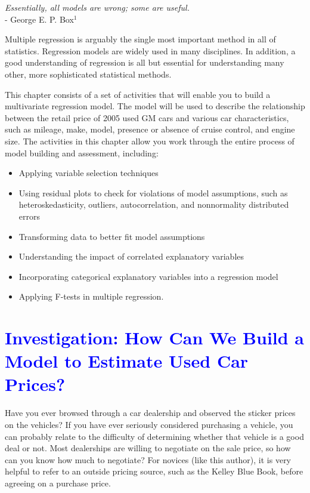 \documentclass[
]{report}
\begin{document}
\begin{flushright}
\emph{Essentially, all models are wrong; some are useful.} \\
- George E. P. Box$^1$
\end{flushright}

Multiple regression is arguably the single most important method in all of statistics.
Regression models are widely used in many disciplines. In addition, a good understanding
of regression is all but essential for understanding many other, more sophisticated
statistical methods.

This chapter consists of a set of activities that will enable you to build a multivariate
regression model. The model will be used to describe the relationship between the retail price of 2005 used GM cars and various car characteristics, such as mileage, make, model, presence or absence of cruise control, and engine size. The activities in this chapter allow you work through the entire process of model building and assessment, including:
\vspace{-1em}

\begin{itemize}
\item  Applying variable selection techniques
\item  Using residual plots to check for violations of model assumptions, such as heteroskedasticity, outliers, autocorrelation, and nonnormality distributed errors
\item  Transforming data to better fit model assumptions
\item  Understanding the impact of correlated explanatory variables
\item  Incorporating categorical explanatory variables into a regression model
\item  Applying F-tests in multiple regression.
\end{itemize}

\newpage

\hypertarget{section-26}{%
\section{\texorpdfstring{\textcolor{blue}{Investigation: How Can We Build a Model to Estimate Used Car Prices?}}{}}\label{section-26}}

Have you ever browsed through a car dealership and observed the sticker prices on the vehicles? If you have ever seriously considered purchasing a vehicle, you can probably relate to the difficulty of determining whether that vehicle is a good deal or not. Most dealerships are willing to negotiate on the sale price, so how can you know how much to negotiate? For novices (like this author), it is very helpful to refer to an outside
pricing source, such as the Kelley Blue Book, before agreeing on a purchase price.
\end{document}
